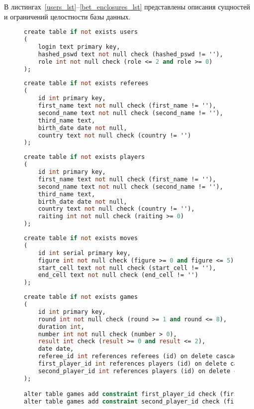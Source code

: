 В листингах~\ref{users_lst}--\ref{bet_enclosures_lst} представлены описания сущностей и ограничений целостности базы данных.
\begin{figure}[H]
	\begin{lstlisting}[label=users_lst,caption=Описание сущности users,language=Caml]
create table if not exists users
(
    login text primary key,
    hashed_pswd text not null check (hashed_pswd != ''),
    role int not null check (role <= 2 and role >= 0)
);
	\end{lstlisting}
\end{figure}
\begin{figure}[H]
	\begin{lstlisting}[label=referees_lst,caption=Описание сущности referees,language=Caml]
create table if not exists referees
(
    id int primary key,
    first_name text not null check (first_name != ''),
    second_name text not null check (second_name != ''),
    third_name text,
    birth_date date not null,
    country text not null check (country != '')
);
	\end{lstlisting}
\end{figure}
\begin{figure}[H]
	\begin{lstlisting}[label=players_lst,caption=Описание сущности players,language=Caml]
create table if not exists players
(
    id int primary key,
    first_name text not null check (first_name != ''),
    second_name text not null check (second_name != ''),
    third_name text,
    birth_date date not null,
    country text not null check (country != ''),
    raiting int not null check (raiting >= 0)
);
	\end{lstlisting}
\end{figure}
\begin{figure}[H]
	\begin{lstlisting}[label=moves_lst,caption=Описание сущности moves,language=Caml]
create table if not exists moves
(
    id int serial primary key,
    figure int not null check (figure >= 0 and figure <= 5),
    start_cell text not null check (start_cell != ''),
    end_cell text not null check (end_cell != '')
);
	\end{lstlisting}
\end{figure}
\begin{figure}[H]
	\begin{lstlisting}[label=games_lst,caption=Описание сущности games,language=Caml]
create table if not exists games
(
    id int primary key,
    round int not null check (round >= 1 and round <= 8),
    duration int,
    number int not null check (number > 0),
    result int check (result >= 0 and result <= 2),
    date date,
    referee_id int references referees (id) on delete cascade,
    first_player_id int references players (id) on delete cascade,
    second_player_id int references players (id) on delete cascade
);

alter table games add constraint first_player_id check (first_player_id != second_player_id);
alter table games add constraint second_player_id check (first_player_id != second_player_id);
	\end{lstlisting}
\end{figure}
